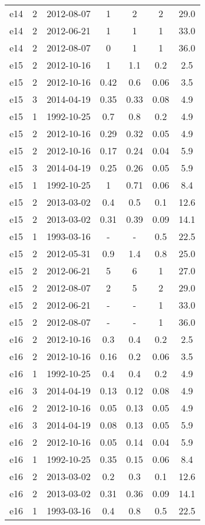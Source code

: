 \begin{table*}[htp]
\begin{tabular}{ccccccc}
e14 & 2 & 2012-08-07 & 1 & 2 & 2 & 29.0 \\
e14 & 2 & 2012-06-21 & 1 & 1 & 1 & 33.0 \\
e14 & 2 & 2012-08-07 & 0 & 1 & 1 & 36.0 \\
e15 & 2 & 2012-10-16 & 1 & 1.1 & 0.2 & 2.5 \\
e15 & 2 & 2012-10-16 & 0.42 & 0.6 & 0.06 & 3.5 \\
e15 & 3 & 2014-04-19 & 0.35 & 0.33 & 0.08 & 4.9 \\
e15 & 1 & 1992-10-25 & 0.7 & 0.8 & 0.2 & 4.9 \\
e15 & 2 & 2012-10-16 & 0.29 & 0.32 & 0.05 & 4.9 \\
e15 & 2 & 2012-10-16 & 0.17 & 0.24 & 0.04 & 5.9 \\
e15 & 3 & 2014-04-19 & 0.25 & 0.26 & 0.05 & 5.9 \\
e15 & 1 & 1992-10-25 & 1 & 0.71 & 0.06 & 8.4 \\
e15 & 2 & 2013-03-02 & 0.4 & 0.5 & 0.1 & 12.6 \\
e15 & 2 & 2013-03-02 & 0.31 & 0.39 & 0.09 & 14.1 \\
e15 & 1 & 1993-03-16 & - & - & 0.5 & 22.5 \\
e15 & 2 & 2012-05-31 & 0.9 & 1.4 & 0.8 & 25.0 \\
e15 & 2 & 2012-06-21 & 5 & 6 & 1 & 27.0 \\
e15 & 2 & 2012-08-07 & 2 & 5 & 2 & 29.0 \\
e15 & 2 & 2012-06-21 & - & - & 1 & 33.0 \\
e15 & 2 & 2012-08-07 & - & - & 1 & 36.0 \\
e16 & 2 & 2012-10-16 & 0.3 & 0.4 & 0.2 & 2.5 \\
e16 & 2 & 2012-10-16 & 0.16 & 0.2 & 0.06 & 3.5 \\
e16 & 1 & 1992-10-25 & 0.4 & 0.4 & 0.2 & 4.9 \\
e16 & 3 & 2014-04-19 & 0.13 & 0.12 & 0.08 & 4.9 \\
e16 & 2 & 2012-10-16 & 0.05 & 0.13 & 0.05 & 4.9 \\
e16 & 3 & 2014-04-19 & 0.08 & 0.13 & 0.05 & 5.9 \\
e16 & 2 & 2012-10-16 & 0.05 & 0.14 & 0.04 & 5.9 \\
e16 & 1 & 1992-10-25 & 0.35 & 0.15 & 0.06 & 8.4 \\
e16 & 2 & 2013-03-02 & 0.2 & 0.3 & 0.1 & 12.6 \\
e16 & 2 & 2013-03-02 & 0.31 & 0.36 & 0.09 & 14.1 \\
e16 & 1 & 1993-03-16 & 0.4 & 0.8 & 0.5 & 22.5 \\

\end{tabular}
\end{table*}
